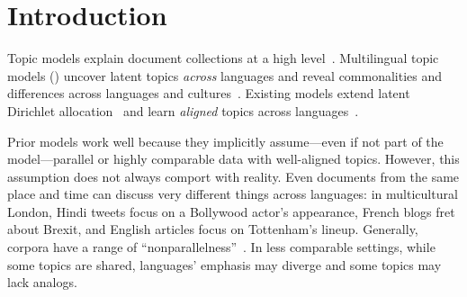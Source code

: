 \section{Introduction}
\label{sec:intro}

Topic models explain document collections at a high
level~\cite{boyd-graber-2017-topic-model-book}.
%
Multilingual topic models (\mtms) uncover latent topics \emph{across}
languages and reveal
commonalities and differences across languages
and cultures~\cite{ni-2009-mtm-wiki,shi-2016-mtm-common,gutierrez-2016-mtm-diff}.
Existing models extend latent Dirichlet
allocation~\cite[\lda]{blei-2003-lda} and learn \emph{aligned} topics
across languages~\cite{mimno-2009-plda}.

Prior models work well because they implicitly assume---even if not part of the
model---parallel or highly comparable data with well-aligned topics.
%
However, this
assumption does not always comport with reality.
%
Even documents from the same place and time
can discuss very different things across languages: in multicultural
London, Hindi tweets focus on a Bollywood actor's
 appearance, French blogs fret
about Brexit, and English articles focus on Tottenham's lineup.
%
Generally, corpora have a range of ``nonparallelness''~\citep{fung-2000-bilingual-stat}.
%
In less comparable settings,
while some topics are shared, languages' emphasis may diverge
and some topics may lack analogs.



